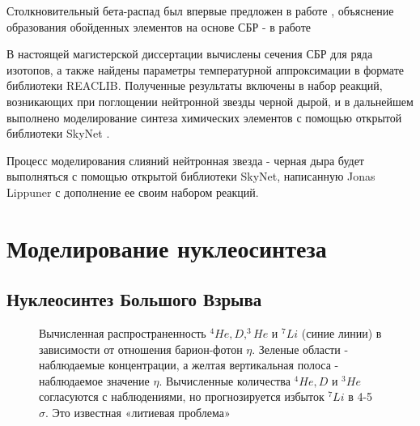 \documentclass[14pt, a4paper]{article}
\numberwithin{figure}{section}
\numberwithin{equation}{section}
\begin{document}
Столкновительный бета-распад был впервые предложен в работе \cite{batkin}, объяснение образования обойденных элементов на
основе СБР - в работе \cite{tak}

В настоящей магистерской диссертации вычислены сечения СБР для ряда изотопов, а также найдены параметры температурной аппроксимации в формате библиотеки REACLIB. Полученные результаты включены в набор реакций, возникающих при поглощении нейтронной звезды черной дырой, и в дальнейшем выполнено моделирование синтеза химических элементов с помощью открытой библиотеки SkyNet \cite{skynet}. 

Процесс моделирования слияний нейтронная звезда - черная дыра будет выполняться с помощью открытой библиотеки SkyNet, написанную Jonas Lippuner с дополнение ее своим набором реакций.


\section{Моделирование нуклеосинтеза}

\subsection{Нуклеосинтез Большого Взрыва}

\begin{figure}[ht]
	\caption{Вычисленная распространенность $^4He, D, ^3He$ и $^7Li$ (синие линии) в зависимости от отношения барион-фотон $\eta$. Зеленые области - наблюдаемые концентрации, а желтая вертикальная полоса - наблюдаемое значение $\eta$. Вычисленные количества $^4He, D$ и $^3He$ согласуются с наблюдениями, но прогнозируется избыток $^7Li$ в 4-5 $\sigma$. Это известная «литиевая проблема»}
	\label{ris:Cocetal}
\end{figure}
\end{document}

